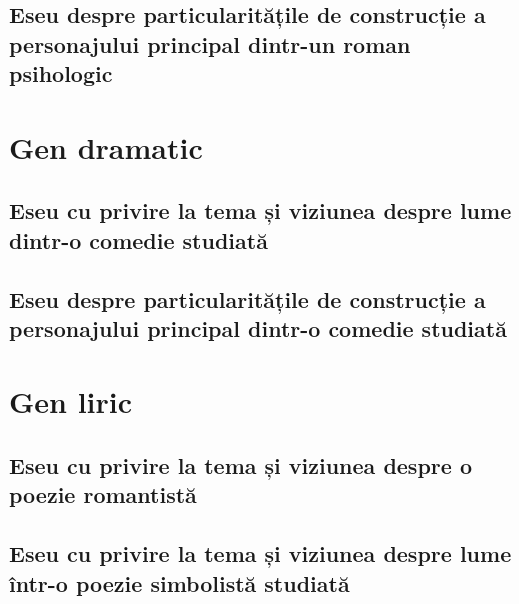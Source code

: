\chapter{Eseu despre particularitățile de construcție a personajului principal dintr-un roman psihologic}





\part{Gen dramatic}


\chapter{Eseu cu privire la tema și viziunea despre lume dintr-o comedie studiată}


\chapter{Eseu despre particularitățile de construcție a personajului principal dintr-o comedie studiată}




\part{Gen liric}


\chapter{Eseu cu privire la tema și viziunea despre o poezie romantistă}



\chapter{Eseu cu privire la tema și viziunea despre lume într-o poezie simbolistă studiată}



